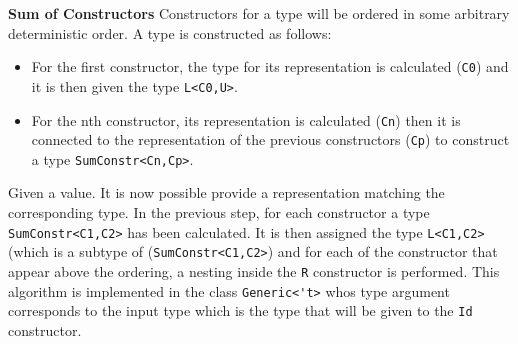 \documentclass[8pt]{extarticle}
\begin{document}
{\bf Sum of Constructors}
Constructors for a type will be ordered in some arbitrary deterministic order. A type is constructed as follows:
\begin{itemize}
\item For the first constructor, the type for its representation is calculated (\verb+C0+) and it is then given the type \verb+L<C0,U>+.
\item For the nth constructor, its representation is calculated (\verb+Cn+) then it is connected to the representation of the previous constructors (\verb+Cp+) to construct a type \verb+SumConstr<Cn,Cp>+.
\end{itemize}
Given a value. It is now possible provide a representation matching the corresponding type. In the previous step, for each constructor a type \verb+SumConstr<C1,C2>+ has been calculated. It is then assigned the type \verb+L<C1,C2>+ (which is a subtype of (\verb+SumConstr<C1,C2>+) and for each of the constructor that appear above the ordering, a nesting inside the \verb+R+ constructor is performed. This algorithm is implemented in the class \verb+Generic<'t>+ whos type argument corresponds to the input type which is the type that will be given to the \verb+Id+ constructor.
\end{document}
